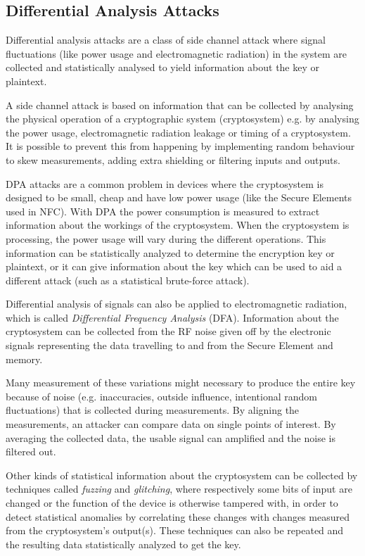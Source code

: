 \subsection{Differential Analysis Attacks}
Differential analysis attacks are a class of side channel attack where signal fluctuations (like power usage and electromagnetic radiation) in the system are collected and statistically analysed to yield information about the key or plaintext.

A side channel attack is based on information that can be collected by analysing the physical operation of a cryptographic system (cryptosystem) e.g. by analysing the power usage, electromagnetic radiation leakage or timing of a cryptosystem.
It is possible to prevent this from happening by implementing random behaviour to skew measurements, adding extra shielding or filtering inputs and outputs.

DPA attacks are a common problem in devices where the cryptosystem is designed to be small, cheap and have low power usage (like the Secure Elements used in NFC).
With DPA the power consumption is measured to extract information about the workings of the cryptosystem.
When the cryptosystem is processing, the power usage will vary during the different operations.
This information can be statistically analyzed to determine the encryption key or plaintext, or it can give information about the key which can be used to aid a different attack (such as a statistical brute-force attack). %

Differential analysis of signals can also be applied to electromagnetic radiation, which is called \textit{Differential Frequency Analysis} (DFA).
Information about the cryptosystem can be collected from the RF noise given off by the electronic signals representing the data travelling to and from the Secure Element and memory.

Many measurement of these variations might necessary to produce the entire key because of noise (e.g. inaccuracies, outside influence, intentional random fluctuations) that is collected during measurements.%
By aligning the measurements, an attacker can compare data on single points of interest.
By averaging the collected data, the usable signal can amplified and the noise is filtered out.

Other kinds of statistical information about the cryptosystem can be collected by techniques called \textit{fuzzing} and \textit{glitching}, where respectively some bits of input are changed or the function of the device is otherwise tampered with, in order to detect statistical anomalies by correlating these changes with changes measured from the cryptosystem's output(s).
These techniques can also be repeated and the resulting data statistically analyzed to get the key.

